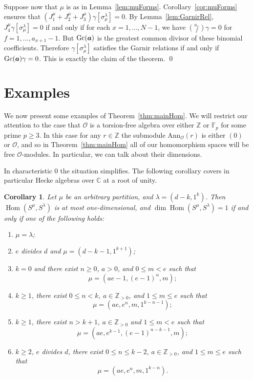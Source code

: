 \documentclass[twoside,11pt,reqno,letter]{amsart}
\numberwithin{equation}{section}
\newtheorem{Corollary}[equation]{Corollary}
\theoremstyle{definition}  %
\def\ba{\text{\boldmath$a$}}
\newcommand{\Hom}{\operatorname{Hom}}
\newcommand{\Gc}{\operatorname{Gc}}
\newcommand{\F}{\mathbb{F}}
\newcommand{\Z}{\mathbb{Z}}
\newcommand{\0}{{\bar 0}}
\newcommand{\1}{{\bar 1}}
\newcommand{\ga}{\gamma}
\newcommand{\la}{\lambda}
\newcommand{\si}{\sigma}
\newcommand{\Ann}{{\mathrm {Ann}}}
\newcommand{\C}{{\mathbb C}}
\renewcommand\O{\mathcal O}
\begin{document}
{  Suppose now that $\mu$ is as in Lemma~\ref{lem:muForms}. Corollary~\ref{cor:muForms} ensures that $(J^\mu_1 + J^\mu_2 + J^\mu_3) \ga [\si^\la_\mu] = 0$. By Lemma~\ref{lem:GarnirRel}, $J^\mu_4 \ga [\si^\la_\mu] = 0$ if and only if for each $x = 1, \dots, N-1$, we have $\binom{a_x}{f} \ga = 0$ for $f = 1, \dots, a_{x+1} - 1$. But $\Gc(\ba)$ is the greatest common divisor of these binomial coefficients. Therefore $\ga [\si^\la_\mu]$ satisfies the Garnir relations if and only if $\Gc(\ba) \ga = 0$. This is exactly the claim of the theorem.
\qed





\section{Examples}

We now present some examples of Theorem~\ref{thm:mainHom}. We will restrict our attention to the case that $\O$ is a torsion-free algebra over either $\Z$ or $\F_p$ for some prime $p \geq 3$. In this case for any $r \in \Z$ the submodule $\Ann_\O(r)$ is either $(0)$ or $\O$, and so in Theorem~\ref{thm:mainHom} all of our homomorphism spaces will be free $\O$-modules. In particular, we can talk about their dimensions.

In characteristic $0$ the situation simplifies. The following corollary covers in particular Hecke algebras over $\C$ at a root of unity. %

\begin{Corollary}
  Let $\mu$ be an arbitrary partition, and $\la = (d-k, 1^k)$. Then $\Hom(S^\mu, S^\la)$ is at most one-dimensional, and $\dim \Hom(S^\mu, S^\la) = 1$ if and only if one of the following holds:
  \begin{enumerate}
    \item $\mu = \la$;
    \item $e$ divides $d$ and $\mu = (d-k-1, 1^{k+1})$;
    \item $k = 0$ and there exist $n \geq 0$, $a > 0$, and $0 \leq m < e$ such that 
$$\mu = (ae-1, (e-1)^n, m);$$
    \item $k \geq 1$, there exist $0 \leq n < k$, $a \in \Z_{>0}$, and $1 \leq m \leq e$ such that 
$$\mu = (a e, e^n, m, 1^{k-n-1});$$
    \item $k \geq 1$, there exist $n > k+1$, $a \in \Z_{>0}$ and $1 \leq m < e$ such that 
$$\mu = (a e, e^{k-1}, (e - 1)^{n-k-1}, m);$$
    \item $k \geq 2$, $e$ divides $d$, there exist $0 \leq n \leq k-2$, $a \in \Z_{>0}$, and $1 \leq m \leq e$ such that 
$$\mu = (a e, e^n, m, 1^{k-n}).$$
  \end{enumerate}
\end{Corollary}

}
\end{document}
